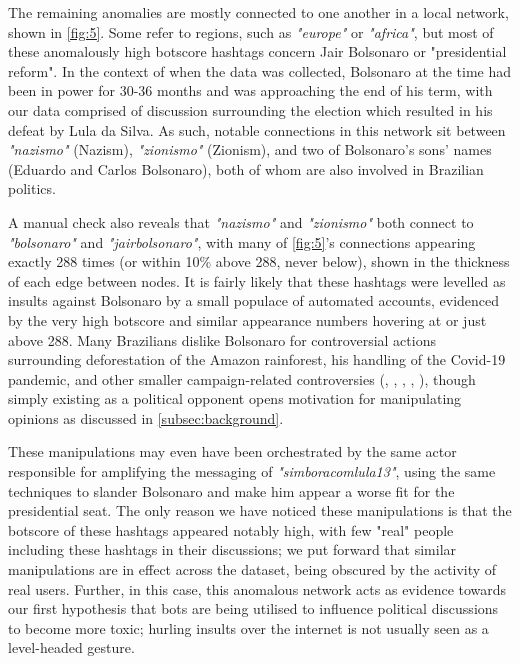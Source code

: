 \documentclass[a4paper,11pt]{article}  %
\begin{document}
	The remaining anomalies are mostly connected to one another in a local network, shown in \autoref{fig:5}. Some refer to regions, such as \textit{"europe"} or \textit{"africa"}, but most of these anomalously high botscore hashtags concern Jair Bolsonaro or "presidential reform". In the context of when the data was collected, Bolsonaro at the time had been in power for 30-36 months and was approaching the end of his term, with our data comprised of discussion surrounding the election which resulted in his defeat by Lula da Silva. As such, notable connections in this network sit between \textit{"nazismo"} (Nazism), \textit{"zionismo"} (Zionism), and two of Bolsonaro's sons' names (Eduardo and Carlos Bolsonaro), both of whom are also involved in Brazilian politics. 
	
	A manual check also reveals that \textit{"nazismo"} and \textit{"zionismo"} both connect to \textit{"bolsonaro"} and \textit{"jairbolsonaro"}, with many of \autoref{fig:5}'s connections appearing exactly 288 times (or within 10\% above 288, never below), shown in the thickness of each edge between nodes. It is fairly likely that these hashtags were levelled as insults against Bolsonaro by a small populace of automated accounts, evidenced by the very high botscore and similar appearance numbers hovering at or just above 288. Many Brazilians dislike Bolsonaro for controversial actions surrounding deforestation of the Amazon rainforest, his handling of the Covid-19 pandemic, and other smaller campaign-related controversies (\parencite{BrazilianAmazonDeforestation}, \parencite{trevisaniBrazilBolsonaroFires2019}, \parencite{dupeyronJustTrumpBrazil2020}, \parencite{BrazilMilitaryChiefs2021}, \parencite{phillipsBrazilJairBolsonaro2018}), though simply existing as a political opponent opens motivation for manipulating opinions as discussed in \autoref{subsec:background}. 
	
	These manipulations may even have been orchestrated by the same actor responsible for amplifying the messaging of \textit{"simboracomlula13"}, using the same techniques to slander Bolsonaro and make him appear a worse fit for the presidential seat. The only reason we have noticed these manipulations is that the botscore of these hashtags appeared notably high, with few "real" people including these hashtags in their discussions; we put forward that similar manipulations are in effect across the dataset, being obscured by the activity of real users. Further, in this case, this anomalous network acts as evidence towards our first hypothesis that bots are being utilised to influence political discussions to become more toxic; hurling insults over the internet is not usually seen as a level-headed gesture.
	
\end{document}
